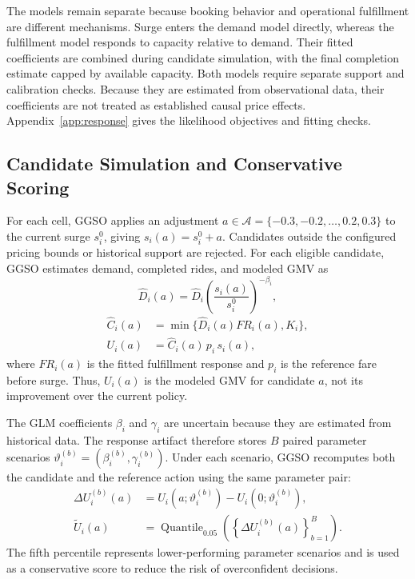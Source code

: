 \documentclass[a4paper,10pt,twocolumn]{article}
\newcommand{\Quant}{\operatorname{Quantile}}
\begin{document}
The models remain separate because booking behavior and operational
fulfillment are different mechanisms. Surge enters the demand model directly,
whereas the fulfillment model responds to capacity relative to demand. Their
fitted coefficients are combined during candidate simulation, with the final
completion estimate capped by available capacity. Both models require separate
support and calibration checks. Because they are estimated from observational
data, their coefficients are not treated as established causal price effects.
Appendix~\ref{app:response} gives the likelihood objectives and fitting checks.

\subsection{Candidate Simulation and Conservative Scoring}
For each cell, GGSO applies an adjustment
$a\in\mathcal A=\{-0.3,-0.2,\ldots,0.2,0.3\}$ to the current surge $s_i^0$,
giving $s_i(a)=s_i^0+a$. Candidates outside the configured pricing bounds or
historical support are rejected. For each eligible candidate, GGSO estimates
demand, completed rides, and modeled GMV as
\begin{equation}
 \widehat D_i(a)=\widehat D_i
 \left(\frac{s_i(a)}{s_i^0}\right)^{-\beta_i},
 \label{eq:response}
\end{equation}
\begin{equation}
\begin{aligned}
 \widehat C_i(a)&=\min\{\widehat D_i(a)FR_i(a),K_i\},\\
 U_i(a)&=\widehat C_i(a)\,p_i\,s_i(a),
\end{aligned}
\label{eq:utility}
\end{equation}
where $FR_i(a)$ is the fitted fulfillment response and $p_i$ is the
reference fare before surge. Thus, $U_i(a)$ is the modeled GMV for candidate
$a$, not its improvement over the current policy.

The GLM coefficients $\beta_i$ and $\gamma_i$ are uncertain because they are
estimated from historical data. The response artifact therefore stores $B$
paired parameter scenarios
$\vartheta_i^{(b)}=(\beta_i^{(b)},\gamma_i^{(b)})$. Under each scenario, GGSO
recomputes both the candidate and the reference action using the same parameter
pair:
\begin{equation}
\begin{aligned}
 \Delta U_i^{(b)}(a)&=U_i(a;\vartheta_i^{(b)})
                     -U_i(0;\vartheta_i^{(b)}),\\
 \widetilde U_i(a)&=\Quant_{0.05}
       \left(\left\{\Delta U_i^{(b)}(a)\right\}_{b=1}^{B}\right).
\end{aligned}
 \label{eq:quantile}
\end{equation}
The fifth percentile represents lower-performing parameter scenarios and is
used as a conservative score to reduce the risk of overconfident decisions.
\end{document}
